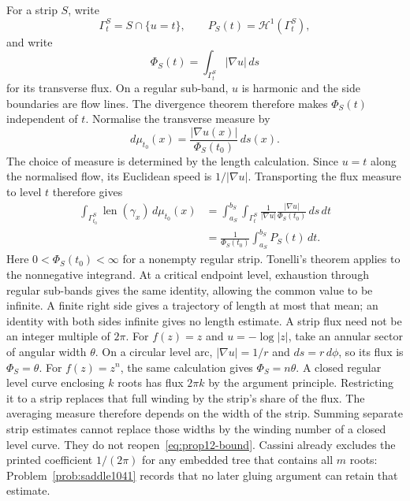 For a strip $S$, write
\[
 \Gamma_t^S=S\cap\{u=t\},\qquad
 P_S(t)=\mathcal H^1(\Gamma_t^S),
\]
and write
\[
 \Phi_S(t)=\int_{\Gamma_t^S}|\nabla u|\,ds
\]
for its transverse flux. On a regular sub-band, $u$ is harmonic and the
side boundaries are flow lines. The divergence theorem therefore makes
$\Phi_S(t)$ independent of $t$. Normalise the transverse measure by
\[
 d\mu_{t_0}(x)=\frac{|\nabla u(x)|}{\Phi_S(t_0)}\,ds(x).
\]
The choice of measure is determined by the length calculation. Since
$u=t$ along the normalised flow, its Euclidean speed is
$1/|\nabla u|$. Transporting the flux measure to level $t$ therefore gives
\[
 \begin{aligned}
 \int_{\Gamma_{t_0}^S}\operatorname{len}(\gamma_x)\,d\mu_{t_0}(x)
 &=\int_{a_S}^{b_S}\int_{\Gamma_t^S}
    \frac1{|\nabla u|}\frac{|\nabla u|}{\Phi_S(t_0)}\,ds\,dt\\
 &=\frac1{\Phi_S(t_0)}\int_{a_S}^{b_S}P_S(t)\,dt .
 \end{aligned}
\]
Here $0<\Phi_S(t_0)<\infty$ for a nonempty regular strip. Tonelli's
theorem applies to the nonnegative integrand. At a critical endpoint
level, exhaustion through regular sub-bands gives the same identity,
allowing the common value to be infinite. A finite right side gives a
trajectory of length at most that mean; an identity with both sides
infinite gives no length estimate.
A strip flux need not be an integer multiple of $2\pi$. For $f(z)=z$
and $u=-\log|z|$, take an annular sector of angular
width $\theta$. On a circular level arc, $|\nabla u|=1/r$ and
$ds=r\,d\phi$, so its flux is $\Phi_S=\theta$.
For $f(z)=z^n$, the same calculation gives $\Phi_S=n\theta$. A closed
regular level curve enclosing $k$ roots has flux $2\pi k$ by the argument
principle. Restricting it to a strip replaces that full winding by the
strip's share of the flux.
The averaging measure therefore depends on the width of the strip.
Summing separate strip estimates cannot replace those widths by the
winding number of a closed level curve.  They do not reopen~\eqref{eq:prop12-bound}.  Cassini already
excludes the printed coefficient $1/(2\pi)$ for any embedded tree that contains
all $m$ roots: Problem~\ref{prob:saddle1041} records that no later gluing
argument can retain that estimate.

